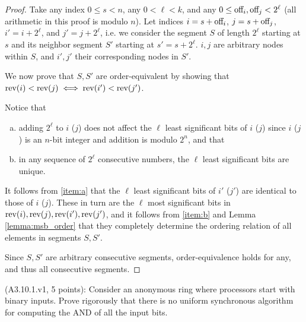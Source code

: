 \begin{proof}
Take any index $0 \leq s < n$, any $0 < \ell < k$, and any $0 \leq \text{off}_{i}, \text{off}_{j} < 2^\ell$ (all
arithmetic in this proof is modulo $n$).
Let indices $i = s + \text{off}_{i}$, $j = s + \text{off}_{j}$, $i' = i + 2^\ell$, and $j' = j + 2^\ell$, i.e.
we consider the segment $S$ of length $2^\ell$ starting at $s$ and its neighbor segment $S'$ starting
at $s' = s + 2^\ell$. $i, j$ are arbitrary nodes within $S$, and $i', j'$ their corresponding nodes
in $S'$.

We now prove that $S, S'$ are order-equivalent by showing that
$\text{rev}(i) < \text{rev}(j) \iff \text{rev}(i') < \text{rev}(j')$.

Notice that 

\begin{enumerate}[a)]
\item adding $2^\ell$ to $i$ ($j$) does not affect the $\ell$ least significant
      bits of $i$ ($j$) since $i$ ($j$) is an $n$-bit integer and addition is modulo $2^n$,
      and that \label{item:a}
\item in any sequence of $2^\ell$ consecutive numbers, the $\ell$ least significant
      bits are unique. \label{item:b}
\end{enumerate}

It follows from \ref{item:a} that the $\ell$ least significant bits of $i'$ ($j'$) are identical to those of
$i$ ($j$). These in turn are the $\ell$ most significant bits in $\text{rev}(i), \text{rev}(j), \text{rev}(i'), \text{rev}(j')$,
and it follows from \ref{item:b} and Lemma \ref{lemma:msb_order} that they 
completely determine the ordering relation of all elements in segments $S, S'$.

Since $S, S'$ are arbitrary consecutive segments, order-equivalence holds for
any, and thus all consecutive segments.
\end{proof}



\begin{Exc}{(A3.10.1.v1, 5 points):}
Consider an anonymous ring where processors start with binary
inputs. Prove rigorously that there is no uniform synchronous
algorithm for computing the AND of all the input bits.
\end{Exc}

